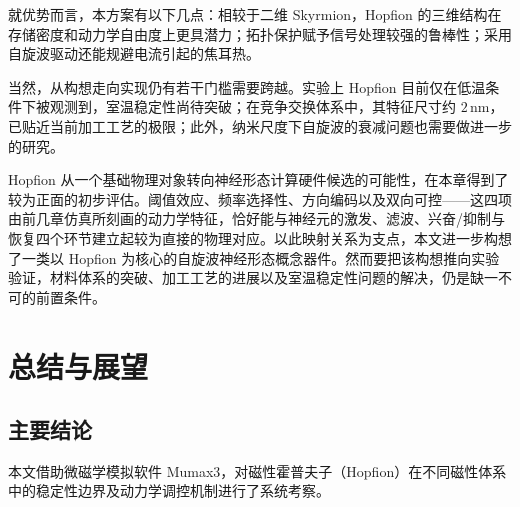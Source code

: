 \documentclass{article}
\begin{document}
就优势而言，本方案有以下几点：相较于二维 Skyrmion，Hopfion 的三维结构在存储密度和动力学自由度上更具潜力；拓扑保护赋予信号处理较强的鲁棒性；采用自旋波驱动还能规避电流引起的焦耳热。

当然，从构想走向实现仍有若干门槛需要跨越。实验上 Hopfion 目前仅在低温条件下被观测到\cite{zheng2023hopfion}，室温稳定性尚待突破；在竞争交换体系中，其特征尺寸约 $2\,\mathrm{nm}$，已贴近当前加工工艺的极限；此外，纳米尺度下自旋波的衰减问题也需要做进一步的研究。


Hopfion 从一个基础物理对象转向神经形态计算硬件候选的可能性，在本章得到了较为正面的初步评估。阈值效应、频率选择性、方向编码以及双向可控——这四项由前几章仿真所刻画的动力学特征，恰好能与神经元的激发、滤波、兴奋/抑制与恢复四个环节建立起较为直接的物理对应。以此映射关系为支点，本文进一步构想了一类以 Hopfion 为核心的自旋波神经形态概念器件。然而要把该构想推向实验验证，材料体系的突破、加工工艺的进展以及室温稳定性问题的解决，仍是缺一不可的前置条件。

\chapter{总结与展望}

\section{主要结论}

本文借助微磁学模拟软件 Mumax3，对磁性霍普夫子（Hopfion）在不同磁性体系中的稳定性边界及动力学调控机制进行了系统考察。
\end{document}
